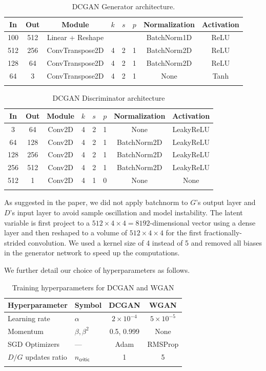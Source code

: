 \documentclass[table]{article}
\begin{document}
\begin{table}[ht]
\centering
\begin{tabular}{c c ccc c c c}
\Xhline{2\arrayrulewidth}
In & Out & Module & $k$ & $s$ & $p$ & Normalization & Activation \\
\hline
100 & 512 &Linear + Reshape &&&& BatchNorm1D & ReLU \\
512 & 256 &ConvTranspose2D & 4 & 2 & 1 & BatchNorm2D & ReLU  \\
128 & 64 &ConvTranspose2D & 4 & 2 & 1 & BatchNorm2D & ReLU  \\
64 & 3 &ConvTranspose2D & 4 & 2 & 1 & None & Tanh\\
\Xhline{2\arrayrulewidth}
\end{tabular}
\caption{DCGAN Generator architecture.}
\end{table}

\begin{table}[ht]
\centering
\begin{tabular}{c c ccc c c c}
\Xhline{2\arrayrulewidth}
In & Out & Module & $k$ & $s$ & $p$ & Normalization & Activation  \\
\hline
3 & 64 &Conv2D & 4 & 2 & 1 & None & LeakyReLU \\
64 & 128 &Conv2D & 4 & 2 & 1 & BatchNorm2D & LeakyReLU \\
128 & 256 &Conv2D & 4 & 2 & 1 & BatchNorm2D & LeakyReLU \\
256 & 512 &Conv2D & 4 & 2 & 1 & BatchNorm2D & LeakyReLU \\
512 & 1 & Conv2D & 4 & 1 & 0& None & None \\
\Xhline{2\arrayrulewidth}
\end{tabular}
\caption{DCGAN Discriminator architecture}
\end{table}

As suggested in the paper, we did not apply batchnorm to $G$'s output layer and $D$'s input layer to avoid sample oscillation and model instability. The latent variable is first project to a $512 \times 4 \times 4 = 8192$-dimensional vector using a dense layer and then reshaped to a volume of $512 \times 4 \times 4$ for the first fractionally-strided convolution. We used a kernel size of 4 instead of 5 and removed all biases in the generator network to speed up the computations.

We further detail our choice of hyperparameters as follows.


\begin{table}[ht]
\centering
\begin{tabular}{l C{1.5cm} c c}
\Xhline{2\arrayrulewidth}
Hyperparameter & Symbol & DCGAN & WGAN \\
\hline
Learning rate & $\alpha$ & $2 \times 10^{-4}$ & $5 \times 10^{-5}$ \\
Momentum & $\beta, \beta^2$ & 0.5, 0.999 & None \\
SGD Optimizers & --- & Adam  & RMSProp \\
$D/G$ updates ratio & $n_{\textsf{critic}}$ & 1 & 5 \\
\Xhline{2\arrayrulewidth}
\end{tabular}
\caption{Training hyperparameters for DCGAN and WGAN}
\end{table}
\end{document}

